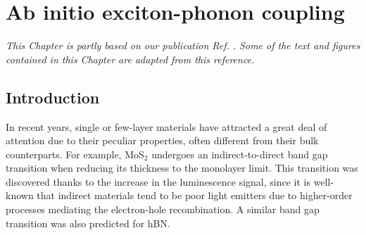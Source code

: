 \chapter{Ab initio exciton-phonon coupling} \label{chap:mBN}
\textit{This Chapter is partly based on our publication Ref. \cite{lechifflart2023first}. Some of the text and figures contained in this Chapter are adapted from this reference.}


\chaptertoc{}
%


%
\section{Introduction}
In recent years, single or few-layer materials have attracted a great deal of attention due to their peculiar properties, often different from their bulk counterparts. For example, MoS$_2$ undergoes an indirect-to-direct band gap transition when reducing its thickness to the monolayer limit.\cite{splendiani2010emerging,Mak_2010}
This transition was discovered thanks to the increase in the luminescence signal, since it is well-known that indirect materials tend to be poor light emitters due to higher-order processes mediating the electron-hole recombination.
A similar band gap transition was also predicted for \acrshort{hBN}.\cite{paleari2018excitons}

